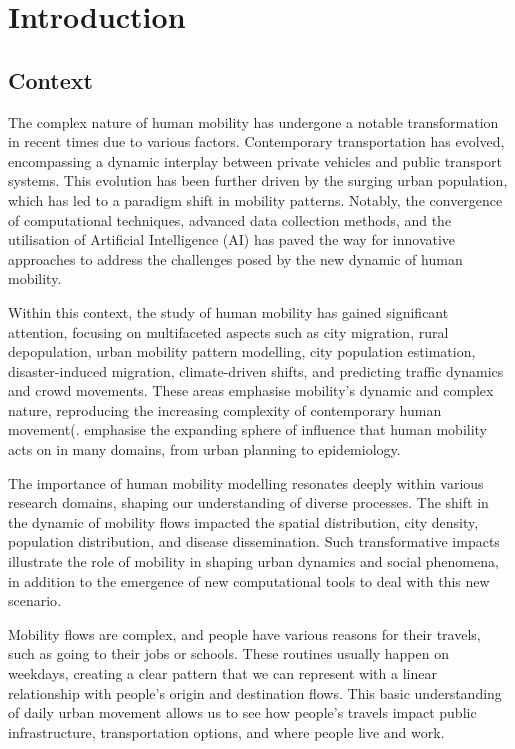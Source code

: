 \chapter{Introduction}
\label{chapterlabel1}

    \section{Context} 

    The complex nature of human mobility has undergone a notable transformation in recent times due to various factors. Contemporary transportation has evolved, encompassing a dynamic interplay between private vehicles and public transport systems. This evolution has been further driven by the surging urban population, which has led to a paradigm shift in mobility patterns\citep{battyInventingFutureCities2018,townsendSmartCitiesBig2013}. Notably, the convergence of computational techniques, advanced data collection methods, and the utilisation of Artificial Intelligence (AI) has paved the way for innovative approaches to address the challenges posed by the new dynamic of human mobility. 
    
    Within this context, the study of human mobility has gained significant attention, focusing on multifaceted aspects such as city migration, rural depopulation, urban mobility pattern modelling, city population estimation, disaster-induced migration, climate-driven shifts, and predicting traffic dynamics and crowd movements. These areas emphasise mobility's dynamic and complex nature, reproducing the increasing complexity of contemporary human movement(\citep{battySizeScaleShape2008, lucaSurveyDeepLearning2021}. \cite{siminiDeepGravityModel2021} emphasise the expanding sphere of influence that human mobility acts on in many domains, from urban planning to epidemiology.
        
    The importance of human mobility modelling resonates deeply within various research domains, shaping our understanding of diverse processes. The shift in the dynamic of mobility flows impacted the spatial distribution, city density, population distribution, and disease dissemination. Such transformative impacts illustrate the role of mobility in shaping urban dynamics and social phenomena, in addition to the emergence of new computational tools to deal with this new scenario\citep{siminiDeepGravityModel2021, lucaSurveyDeepLearning2021}. 
    
    Mobility flows are complex, and people have various reasons for their travels, such as going to their jobs or schools. These routines usually happen on weekdays, creating a clear pattern that we can represent with a linear relationship with people's origin and destination flows\citep{siminiDeepGravityModel2021}. This basic understanding of daily urban movement allows us to see how people's travels impact public infrastructure, transportation options, and where people live and work.
    
